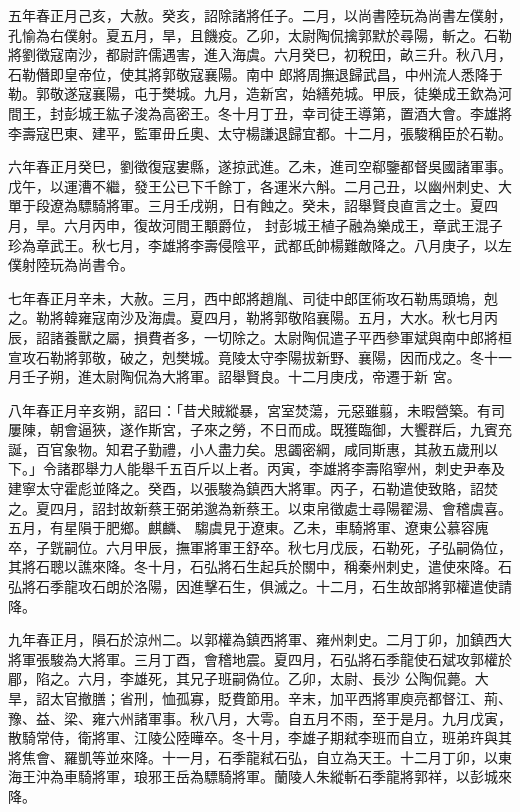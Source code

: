 \begin{pinyinscope}
 五年春正月己亥，大赦。癸亥，詔除諸將任子。二月，以尚書陸玩為尚書左僕射，孔愉為右僕射。夏五月，旱，且饑疫。乙卯，太尉陶侃擒郭默於尋陽，斬之。石勒將劉徵寇南沙，都尉許儒遇害，進入海虞。六月癸巳，初稅田，畝三升。秋八月，石勒僭即皇帝位，使其將郭敬寇襄陽。南中
 郎將周撫退歸武昌，中州流人悉降于勒。郭敬遂寇襄陽，屯于樊城。九月，造新宮，始繕苑城。甲辰，徒樂成王欽為河間王，封彭城王紘子浚為高密王。冬十月丁丑，幸司徒王導第，置酒大會。李雄將李壽寇巴東、建平，監軍毌丘奧、太守楊謙退歸宜都。十二月，張駿稱臣於石勒。



 六年春正月癸巳，劉徵復寇婁縣，遂掠武進。乙未，進司空郗鑒都督吳國諸軍事。戊午，以運漕不繼，發王公已下千餘丁，各運米六斛。二月己丑，以幽州刺史、大單于段遼為驃騎將軍。三月壬戌朔，日有蝕之。癸未，詔舉賢良直言之士。夏四月，旱。六月丙申，復故河間王顒爵位，
 封彭城王植子融為樂成王，章武王混子珍為章武王。秋七月，李雄將李壽侵陰平，武都氐帥楊難敵降之。八月庚子，以左僕射陸玩為尚書令。



 七年春正月辛未，大赦。三月，西中郎將趙胤、司徒中郎匡術攻石勒馬頭塢，剋之。勒將韓雍寇南沙及海虞。夏四月，勒將郭敬陷襄陽。五月，大水。秋七月丙辰，詔諸養獸之屬，損費者多，一切除之。太尉陶侃遣子平西參軍斌與南中郎將桓宣攻石勒將郭敬，破之，剋樊城。竟陵太守李陽拔新野、襄陽，因而戍之。冬十一月壬子朔，進太尉陶侃為大將軍。詔舉賢良。十二月庚戌，帝遷于新
 宮。



 八年春正月辛亥朔，詔曰：「昔犬賊縱暴，宮室焚蕩，元惡雖翦，未暇營築。有司屢陳，朝會逼狹，遂作斯宮，子來之勞，不日而成。既獲臨御，大饗群后，九賓充誕，百官象物。知君子勤禮，小人盡力矣。思蠲密綱，咸同斯惠，其赦五歲刑以下。」令諸郡舉力人能舉千五百斤以上者。丙寅，李雄將李壽陷寧州，刺史尹奉及建寧太守霍彪並降之。癸酉，以張駿為鎮西大將軍。丙子，石勒遣使致賂，詔焚之。夏四月，詔封故新蔡王弼弟邈為新蔡王。以束帛徵處士尋陽翟湯、會稽虞喜。五月，有星隕于肥鄉。麒麟、
 騶虞見于遼東。乙未，車騎將軍、遼東公慕容廆卒，子皝嗣位。六月甲辰，撫軍將軍王舒卒。秋七月戊辰，石勒死，子弘嗣偽位，其將石聰以譙來降。冬十月，石弘將石生起兵於關中，稱秦州刺史，遣使來降。石弘將石季龍攻石朗於洛陽，因進擊石生，俱滅之。十二月，石生故部將郭權遣使請降。



 九年春正月，隕石於涼州二。以郭權為鎮西將軍、雍州刺史。二月丁卯，加鎮西大將軍張駿為大將軍。三月丁酉，會稽地震。夏四月，石弘將石季龍使石斌攻郭權於郿，陷之。六月，李雄死，其兄子班嗣偽位。乙卯，太尉、長沙
 公陶侃薨。大旱，詔太官撤膳；省刑，恤孤寡，貶費節用。辛末，加平西將軍庾亮都督江、荊、豫、益、梁、雍六州諸軍事。秋八月，大雩。自五月不雨，至于是月。九月戊寅，散騎常侍，衛將軍、江陵公陸曄卒。冬十月，李雄子期弒李班而自立，班弟玝與其將焦會、羅凱等並來降。十一月，石季龍弒石弘，自立為天王。十二月丁卯，以東海王沖為車騎將軍，琅邪王岳為驃騎將軍。蘭陵人朱縱斬石季龍將郭祥，以彭城來降。




\end{pinyinscope}

